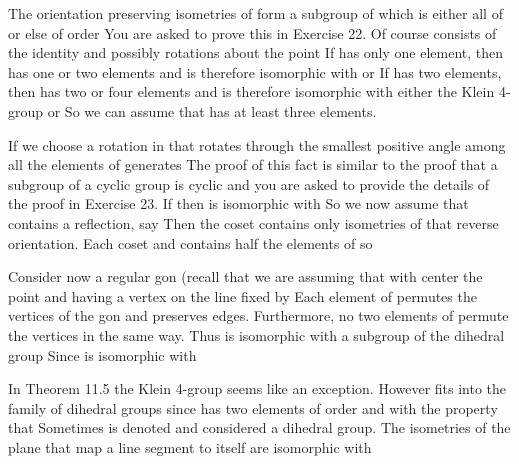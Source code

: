 \documentclass[11pt,oneside]{article}
\begin{document}
\begin{BookBody}

The orientation preserving isometries of  form a subgroup  of  which is either all of  or else of order  You are asked to prove this in Exercise 22. Of course  consists of the identity and possibly rotations about the point  If  has only one element, then  has one or two elements and is therefore isomorphic with  or  If  has two elements, then  has two or four elements and is therefore isomorphic with either the Klein 4-group or  So we can assume that  has at least three elements.

If we choose a rotation \BookInline{\rho } in  that rotates through the smallest positive angle \BookInline{\theta } among all the elements of  generates  The proof of this fact is similar to the proof that a subgroup of a cyclic group is cyclic and you are asked to provide the details of the proof in Exercise 23. If  then  is isomorphic with  So we now assume that  contains a reflection, say  Then the coset  contains only isometries of  that reverse orientation. Each coset  and  contains half the elements of  so 

Consider now a regular gon (recall that we are assuming that  with center the point  and having a vertex  on the line fixed by  Each element of  permutes the vertices of the gon and preserves edges. Furthermore, no two elements of  permute the vertices in the same way. Thus  is isomorphic with a subgroup of the dihedral group  Since  is isomorphic with \BookEnd{\blacklozenge}

In Theorem 11.5 the Klein 4-group seems like an exception. However fits into the family of dihedral groups since  has two elements of order  and  with the property that  Sometimes  is denoted  and considered a dihedral group. The isometries of the plane that map a line segment to itself are isomorphic with 


\end{BookBody}
\end{document}
